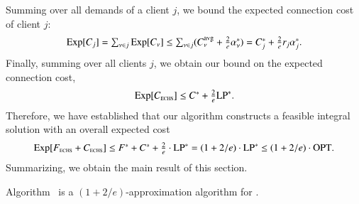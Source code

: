 Summing over all demands of a client $j$, we bound
the expected connection cost of client $j$:
%
\begin{equation*}
	\textstyle
  \mbox{\rm Exp}[C_j] = \sum_{\nu\in j} \mbox{\rm Exp}[C_\nu] 
\leq {\textstyle\sum_{\nu\in j} (C^{{\mbox{\scriptsize\rm avg}}}_{\nu} + \frac{2}{e}\alpha_{\nu}^\ast) }
  = \textstyle{ C_j^\ast + \frac{2}{e}r_j\alpha_j^\ast}.
\end{equation*}
%
Finally, summing over all clients $j$, we obtain our bound on
the expected connection cost,
%
\begin{equation*}
\textstyle	 \mbox{\rm Exp}[ C_{\mbox{\tiny\rm ECHS}}] \le C^\ast +
\frac{2}{e}\mbox{\rm LP}^\ast.
\end{equation*}
% 
Therefore, we have established that
our algorithm constructs a feasible integral solution with
an overall expected cost 
%
\begin{equation*}
  \label{eq:chudakall}
	 \mbox{\rm Exp}[ F_{\mbox{\tiny\rm ECHS}} + C_{\mbox{\tiny\rm ECHS}}]
	\le
	\textstyle
  	F^\ast + C^\ast + \frac{2}{e}\cdot \mbox{\rm LP}^\ast = (1+2/e)\cdot \mbox{\rm LP}^\ast
  \leq (1+2/e)\cdot \mbox{\rm OPT}.
\end{equation*}
%
Summarizing, we obtain the main result of this section.

\begin{theorem}\label{thm:1736}
  Algorithm~{\ECHS} is a $(1+2/e)$-approximation algorithm for \FTFP.
\end{theorem}